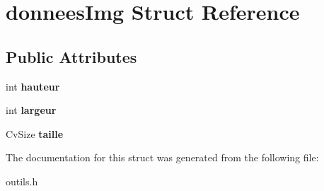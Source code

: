 \hypertarget{structdonneesImg}{}\section{donnees\+Img Struct Reference}
\label{structdonneesImg}
\subsection*{Public Attributes}
\begin{DoxyCompactItemize}
\item 
int {\bfseries hauteur}\hypertarget{structdonneesImg_aaeecaf2b85d5d21f80fcbc9369f84b40}{}\label{structdonneesImg_aaeecaf2b85d5d21f80fcbc9369f84b40}

\item 
int {\bfseries largeur}\hypertarget{structdonneesImg_aac90cc090e5b2f4bbf136fb7ad53b88f}{}\label{structdonneesImg_aac90cc090e5b2f4bbf136fb7ad53b88f}

\item 
Cv\+Size {\bfseries taille}\hypertarget{structdonneesImg_aaae8951bd6883e4361908edceeb17837}{}\label{structdonneesImg_aaae8951bd6883e4361908edceeb17837}

\end{DoxyCompactItemize}


The documentation for this struct was generated from the following file\+:\begin{DoxyCompactItemize}
\item 
outils.\+h\end{DoxyCompactItemize}
